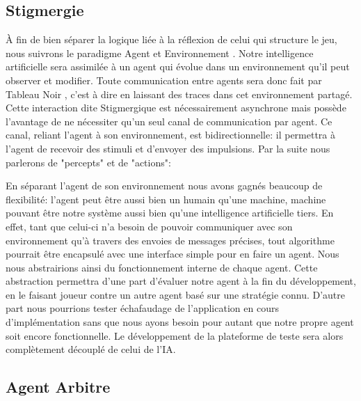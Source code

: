 \subsection{ \og Stigmergie \fg{} }

À fin de bien séparer la logique liée à la réflexion de celui qui structure le jeu, nous suivrons le paradigme \og Agent et Environnement \fg{}. Notre intelligence artificielle sera assimilée à un agent qui évolue dans un environnement qu'il peut observer et modifier. 
Toute communication entre agents sera donc fait par \og Tableau Noir \fg{}, c'est à dire en laissant des traces dans cet environnement partagé. Cette interaction dite \og Stigmergique \fg{} est nécessairement asynchrone mais possède l'avantage de ne nécessiter qu'un seul canal de communication par agent.
Ce canal, reliant l'agent à son environnement, est bidirectionnelle: il permettra à l'agent de recevoir des stimuli et d'envoyer des impulsions. Par la suite nous parlerons de "percepts" et de "actions":


En séparant l'agent de son environnement nous avons gagnés beaucoup de flexibilité: l'agent peut être aussi bien un humain qu'une machine, machine pouvant être notre système aussi bien qu'une intelligence artificielle tiers. 
En effet, tant que celui-ci n'a besoin de pouvoir communiquer avec son environnement qu'à travers des envoies de messages précises, tout algorithme pourrait être encapsulé avec une interface simple pour en faire un agent. Nous nous abstrairions ainsi du fonctionnement interne de chaque agent.
Cette abstraction permettra d'une part d'évaluer notre agent à la fin du développement, en le faisant joueur contre un autre agent basé sur une stratégie connu. D'autre part nous pourrions tester échafaudage de l'application en cours d'implémentation sans que nous ayons besoin pour autant que notre propre agent soit encore fonctionnelle. Le développement de la plateforme de teste sera alors complètement découplé de celui de l'IA.

\subsection{ Agent \og Arbitre \fg{} }

